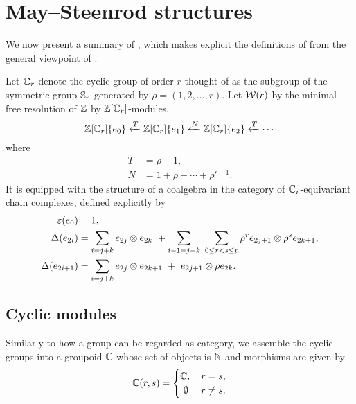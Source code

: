 
\section{May--Steenrod structures}

We now present a summary of \cite{medina2021may_st}, which makes explicit the definitions of \cite{steenrod1953cyclic} from the general viewpoint of \cite{may1970general}.

Let $\mathbb{C}_r$ denote the cyclic group of order $r$ thought of as the subgroup of the symmetric group $\mathbb{S}_r$ generated by $\rho = (1,2,\dots,r)$.
Let $\mathcal{W}(r)$ by the minimal free resolution of $\mathbb{Z}$ by $\mathbb{Z}[\mathbb{C}_r]$-modules,
\begin{equation}\label{eq: minimal resolution}
	\mathbb{Z}[\mathbb{C}_r]\{e_0\} \xleftarrow{T} \mathbb{Z}[\mathbb{C}_r]\{e_1\} \xleftarrow{N} \mathbb{Z}[\mathbb{C}_r]\{e_2\} \xleftarrow{T} \cdots
\end{equation}
where
\begin{equation} \label{eq: T and R definition}
	\begin{split}
		T &= \rho - 1, \\
		N &= 1 + \rho + \cdots + \rho^{r-1}.
	\end{split}
\end{equation}
It is equipped with the structure of a coalgebra in the category of $\mathbb{C}_r$-equivariant chain complexes, defined explicitly by
\begin{align*}
	\varepsilon(e_0) &= 1, \\
	\Delta(e_{2i}) &=
	\sum_{i=j+k} e_{2j} \otimes e_{2k} \ + \sum_{i-1=j+k} \ \sum_{0 \leq r < s \leq p} \rho^r e_{2j+1} \otimes \rho^s e_{2k+1}, \\
	\Delta(e_{2i+1}) &=
	\sum_{i=j+k} e_{2j} \otimes e_{2k+1} \ +\ e_{2j+1} \otimes \rho e_{2k}.
\end{align*}


\subsection{Cyclic modules}

Similarly to how a group can be regarded as category, we assemble the cyclic groups into a groupoid $\mathbb{C}$ whose set of objects is $\mathbb{N}$ and morphisms are given by
\[
\cyc(r,s) =
\begin{cases}
	\cyc_r & r = s, \\
	\hfil \emptyset & r \neq s.
\end{cases}
\]

